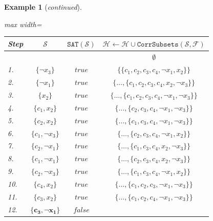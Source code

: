 \documentclass[twoside,11pt]{article}
\newcommand\m[1]{\mathcal{#1}}
\newtheorem{example}{Example}
\newcommand\comment[1]{\marginpar{\tiny #1}}
\renewcommand\comment[1]{#1}
\newcommand{\bart}[1]{{\comment{\color{OliveGreen}Bart: #1}}}
\newcommand\setstohit{\ensuremath{\m{H} }\xspace}
\newcommand\formula{\ensuremath{\m{F} }\xspace}
\newcommand\mm[1]{\ensuremath{#1}\xspace}
\newcommand\call[1]{\mm{\texttt{#1}}}
\newcommand\sat{\texttt{{SAT}}\xspace}
\newcommand\corrsubsets{\mm{\call{CorrSubsets}}}
\begin{document}
\begin{example}[\textit{continued}]
\begin{table}[!h]
	\centering
	\begin{adjustbox}{max width=\textwidth}
		\begin{tabular}{lccc} 
			Step & $\m{S}$                             & $\sat(\m{S})$ & $\setstohit  \gets \setstohit  \cup  \corrsubsets(\m{S}, \formula) $ \\ 
			\toprule[2pt]
			&        &    &      $\emptyset$                                \\
			\midrule
			1. & $\{ \lnot x_3\}$   &$\mathit{true}$ &  $\{\{c_1, c_2, c_3, c_4, \lnot x_1, x_2 \}\}$\\\midrule
			2. & $\{ \lnot x_1\}$   &$\mathit{true}$ &   $\{  \dots, \{ c_1, c_2, c_3, c_4, x_2, \lnot x_3 \}\}$\\
			\midrule
			3. & $\{ x_2\}$   		&$\mathit{true}$&  $\{ \dots, \{c_1, c_2, c_3, c_4, \lnot x_1, \lnot x_3 \}\}$\\
			\midrule
			4. & $\{ c_1,  x_2\}$   	&$\mathit{true}$ &$\{ \dots, \{c_2, c_3, c_4, \lnot x_1, \lnot x_3 \}\}$\\
			\midrule
			5. & $\{c_2, x_2\}$ 	&$\mathit{true}$ &$\{ \dots, \{c_1, c_3, c_4, \lnot x_1, \lnot x_3 \}\}$\\
			\midrule
			6. & $\{c_1, \lnot x_3\}$ 	&$\mathit{true}$ &$\{ \dots, \{c_2, c_3, c_4, \lnot x_1, x_2 \}\}$\\
			\midrule
			7. & $\{c_2, \lnot x_1\}$ 	&$\mathit{true}$ &$\{ \dots, \{c_1, c_3, c_4,x_2,  \lnot x_3 \}\}$\\
			\midrule
			8. & $\{c_1, \lnot x_1\}$ 	&$\mathit{true}$ &$\{ \dots, \{c_2, c_3, c_4, x_2, \lnot x_3 \}\}$\\
			\midrule
			9. & $\{c_2, \lnot x_3 \}$ 	&$\mathit{true}$ &$\{ \dots, \{c_1, c_3, c_4, \lnot x_1, x_2 \}\}$\\
			\midrule
			10. & $\{ c_4, x_2\}$ 	&$\mathit{true}$ &$\{ \dots, \{c_1, c_2, c_3, \lnot x_1, \lnot x_3 \}\}$\\
			\midrule
			11. & $\{ c_3, x_2\}$ 	&$\mathit{true}$ &$\{ \dots, \{c_1, c_2, c_4, \lnot x_1, \lnot x_3 \}\}$\\
			\midrule
			12. & $\mathbf{\{ c_3, \lnot x_1\}}$ 	&$\mathit{false}$  & \\
			

\end{tabular}
\end{adjustbox}
\end{table}
\end{example}
\end{document}

